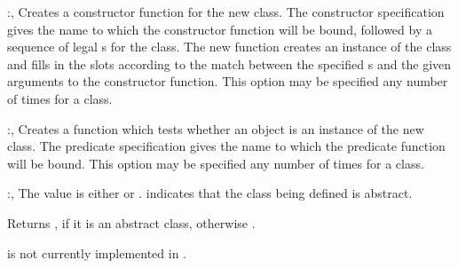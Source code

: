 \begin{optDefinition}
\begin{options}
    \item[\keyworddef{constructor}:, \scref{constructor-specification}]%
    Creates a constructor function for the new class.  The constructor
    specification gives the name to which the constructor function will be
    bound, followed by a sequence of legal s for the class.  The
    new function creates an instance of the class and fills in the slots
    according to the match between the specified s and the given
    arguments to the constructor function.  This option may be specified any
    number of times for a class.

    \item[\keyworddef{predicate}:, \scref{identifier}]%
    Creates a function which tests whether an object is an instance of the new
    class.  The predicate specification gives the name to which the predicate
    function will be bound.  This option may be specified any number of times
    for a class.

    \item[\keyworddef{abstract?}:, \scref{boolean}]%
    The value is either \true{} or \nil{}. \true{} indicates that the class
    being defined is abstract.
%
\end{options}
%
\end{optDefinition}
%
%
\Signature
{}
%
%
\begin{arguments}
    \item[\scref{object}] Returns , if it is an abstract class,
    otherwise \nil{}.
\end{arguments}
%
\begin{note}
     is not currently implemented in \youtoo.
\end{note}
%
